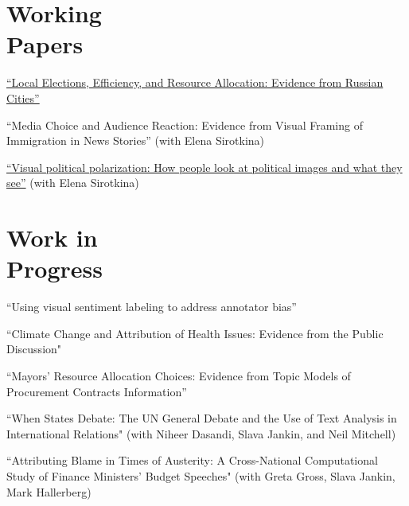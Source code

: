\documentclass[margin,line,10.95pt]{res}
\begin{document}
\begin{resume}
\section{\sc Working \\ Papers}
\href{https://olgasparyan.com/documents/jmp_feb.pdf}{``Local Elections, Efficiency, and Resource Allocation: Evidence from Russian Cities''}

\vspace*{-2.5mm}

``Media Choice and Audience Reaction: Evidence from Visual Framing of Immigration in News Stories'' (with Elena Sirotkina)

\vspace*{-2.5mm}
\href{https://www.dropbox.com/s/25dtsp9ky1awc5g/Sirotkina_Gasparyan_VisPolarization.pdf?dl=0}{``Visual political polarization: How people look at political images and what they see''} (with Elena Sirotkina)


\section{\sc Work in \\ Progress}

``Using visual sentiment labeling to address annotator bias''  


 \vspace*{-3.5mm}
``Climate Change and Attribution of Health Issues: Evidence from the Public Discussion" 

\vspace*{-2.5mm}

``Mayors’ Resource Allocation Choices: Evidence from Topic Models of Procurement
Contracts Information''

\vspace*{-3.5mm}
``When States Debate: The UN General Debate and the Use of Text Analysis in International Relations" (with Niheer Dasandi, Slava Jankin, and Neil Mitchell)

\vspace*{-3.5mm}
``Attributing Blame in Times of Austerity: A Cross-National Computational Study of Finance Ministers' Budget Speeches" (with Greta Gross, Slava Jankin, Mark Hallerberg)



\end{resume}
\end{document}
